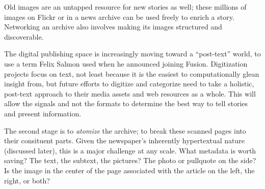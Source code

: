 Old images are an untapped resource for new stories as well; these millions of images on Flickr or in a news archive can be used freely to enrich a story. Networking an archive also involves making its images structured and discoverable.

The digital publishing space is increasingly moving toward a ``post-text'' world, to use a term Felix Salmon used when he announced joining Fusion. Digitization projects focus on text, not least because it is the easiest to computationally glean insight from, but future efforts to digitize and categorize need to take a holistic, post-text approach to their media assets and web resources as a whole. This will allow the signals and not the formats to determine the best way to tell stories and present information.


The second stage is to \emph{atomize} the archive; to break these scanned pages into their consituent parts. Given the newspaper's inherently hypertextual nature (discussed later), this is a major challenge at any scale. What metadata is worth saving? The text, the subtext, the pictures? The photo or pullquote on the side? Is the image in the center of the page associated with the article on the left, the right, or both?

